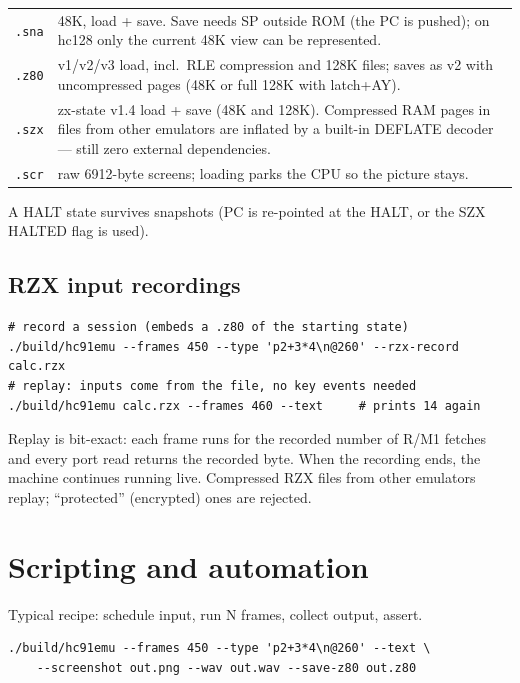 \documentclass[11pt,a4paper]{article}
\newcommand{\opt}[1]{\texttt{#1}}
\begin{document}
\begin{tabularx}{\textwidth}{lX}
\toprule
\opt{.sna} & 48K, load + save. Save needs SP outside ROM (the PC is
pushed); on hc128 only the current 48K view can be represented. \\
\opt{.z80} & v1/v2/v3 load, incl.\ RLE compression and 128K files;
saves as v2 with uncompressed pages (48K or full 128K with
latch+AY). \\
\opt{.szx} & zx-state v1.4 load + save (48K and 128K). Compressed RAM
pages in files from other emulators are inflated by a built-in
DEFLATE decoder --- still zero external dependencies. \\
\opt{.scr} & raw 6912-byte screens; loading parks the CPU so the
picture stays. \\
\bottomrule
\end{tabularx}

A HALT state survives snapshots (PC is re-pointed at the HALT, or the
SZX HALTED flag is used).

\subsection{RZX input recordings}

\begin{Verbatim}
# record a session (embeds a .z80 of the starting state)
./build/hc91emu --frames 450 --type 'p2+3*4\n@260' --rzx-record calc.rzx
# replay: inputs come from the file, no key events needed
./build/hc91emu calc.rzx --frames 460 --text     # prints 14 again
\end{Verbatim}

Replay is bit-exact: each frame runs for the recorded number of R/M1
fetches and every port read returns the recorded byte. When the
recording ends, the machine continues running live. Compressed RZX
files from other emulators replay; ``protected'' (encrypted) ones are
rejected.

\section{Scripting and automation}

Typical recipe: schedule input, run N frames, collect output, assert.

\begin{Verbatim}
./build/hc91emu --frames 450 --type 'p2+3*4\n@260' --text \
    --screenshot out.png --wav out.wav --save-z80 out.z80
\end{Verbatim}
\end{document}
